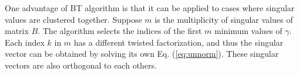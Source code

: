 One advantage of BT algorithm is that it can be applied to cases where singular values are clustered together.
Suppose $m$ is the multiplicity of singular values of matrix $B$. 
The algorithm selects the indices of the first $m$ minimum values of $\gamma$. %
Each index $k$ in $m$ has a different twisted factorization, and thus the singular vector can be obtained by solving its own Eq. (\ref{eq:unnorm}). These singular vectors are also orthogonal to each others\cite{09NLAAtwisted}.
%

